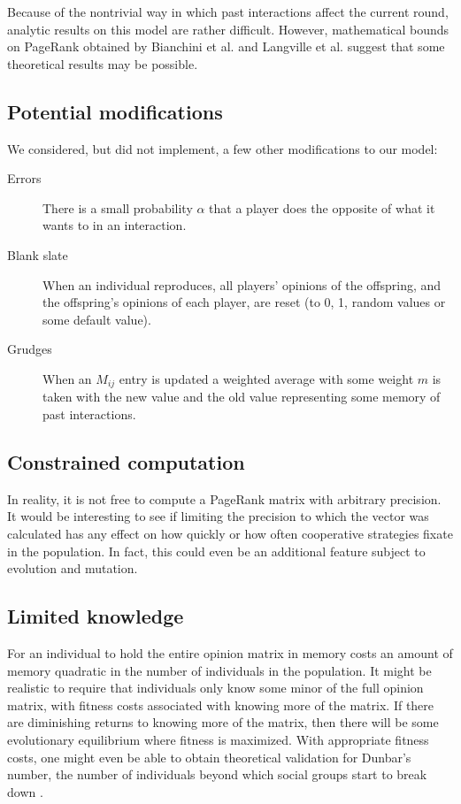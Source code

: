 \documentclass{amsart}
\begin{document}
Because of the nontrivial way in which past interactions affect the
current round, analytic results on this model are rather
difficult. However, mathematical bounds on PageRank obtained by
Bianchini et al. \cite{bianchini_Inside_2005} and Langville et
al. \cite{langville_deeper_2004} suggest that some theoretical results
may be possible.

\subsection{Potential modifications}

We considered, but did not implement, a few other modifications to our
model:
\begin{description}
\item[Errors] There is a small probability $\alpha$ that a player does
  the opposite of what it wants to in an interaction.
\item[Blank slate] When an individual reproduces, all players'
  opinions of the offspring, and the offspring's opinions of each
  player, are reset (to 0, 1, random values or some default value).
\item[Grudges] When an $M_{ij}$ entry is updated a weighted average
  with some weight $m$ is taken with the new value and the old value
  representing some memory of past interactions.
\end{description}

\subsection{Constrained computation}

In reality, it is not free to compute a PageRank matrix with arbitrary
precision. It would be interesting to see if limiting the precision to
which the vector was calculated has any effect on how quickly or how
often cooperative strategies fixate in the population. In fact, this
could even be an additional feature subject to evolution and mutation.

\subsection{Limited knowledge}

For an individual to hold the entire opinion matrix in memory costs an
amount of memory quadratic in the number of individuals in the
population. It might be realistic to require that individuals only
know some minor of the full opinion matrix, with fitness costs
associated with knowing more of the matrix. If there are diminishing
returns to knowing more of the matrix, then there will be some
evolutionary equilibrium where fitness is maximized. With appropriate
fitness costs, one might even be able to obtain theoretical validation
for Dunbar's number, the number of individuals beyond which social
groups start to break down \cite{dunbar_neocortex_1995}.

 
\end{document}
